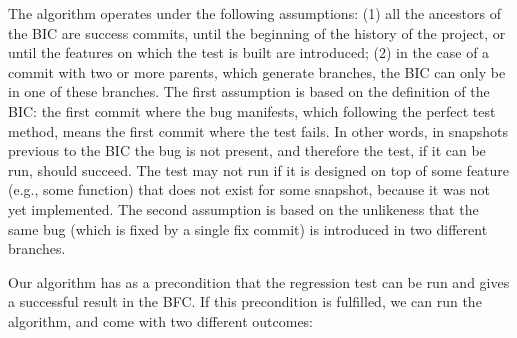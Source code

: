 The algorithm operates under the following assumptions: (1) all the ancestors of the BIC are success commits, until the beginning of the history of the project, or until the features on which the test is built are introduced; (2) in the case of a commit with two or more parents, which generate branches, the BIC can only be in one of these branches.
The first assumption is based on the definition of the BIC: the first commit where the bug manifests, which following the perfect test method, means the first commit where the test fails. In other words, in snapshots previous to the BIC the bug is not present, and therefore the test, if it can be run, should succeed. The test may not run if it is designed on top of some feature (e.g., some function) that does not exist for some snapshot, because it was not yet implemented.
The second assumption is based on the unlikeness that the same bug (which is fixed by a single fix commit) is introduced in two different branches. 

Our algorithm has as a precondition that the regression test can be run and gives a successful result in the BFC.
If this precondition is fulfilled, we can run the algorithm, and come with two different outcomes:

